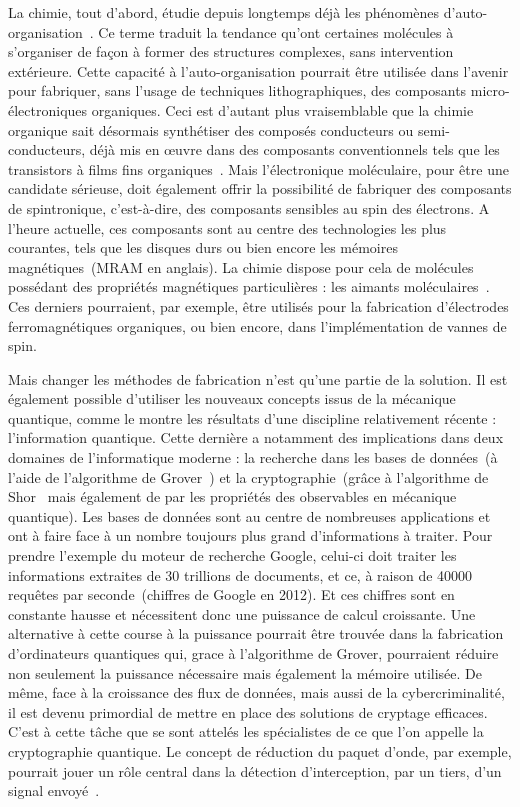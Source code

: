 La chimie, tout d'abord, étudie depuis longtemps déjà les phénomènes d'auto-organisation~\cite{Lehn1988,Lehn1996}. Ce terme traduit la tendance qu'ont certaines molécules à s'organiser de façon à former des structures complexes, sans intervention extérieure. Cette capacité à l'auto-organisation pourrait être utilisée dans l'avenir pour fabriquer, sans l'usage de techniques lithographiques, des composants micro-électroniques organiques. Ceci est d'autant plus vraisemblable que la chimie organique sait désormais synthétiser des composés conducteurs ou semi-conducteurs, déjà mis en œuvre dans des composants conventionnels tels que les transistors à films fins organiques~\cite{Horowitz1990,Lin1997,Klauk2007}. Mais l'électronique moléculaire, pour être une candidate sérieuse, doit également offrir la possibilité de fabriquer des composants de spintronique, c'est-à-dire, des composants sensibles au spin des électrons. A l'heure actuelle, ces composants sont au centre des technologies les plus courantes, tels que les disques durs ou bien encore les mémoires magnétiques~(MRAM en anglais). La chimie dispose pour cela de molécules possédant des propriétés magnétiques particulières : les aimants moléculaires~\cite{Gatteschi2006}. Ces derniers pourraient, par exemple, \^etre utilisés pour la fabrication d'électrodes ferromagnétiques organiques, ou bien encore, dans l'implémentation de vannes de spin.

Mais changer les méthodes de fabrication n'est qu'une partie de la solution. Il est également possible d'utiliser les nouveaux concepts issus de la mécanique quantique, comme le montre les résultats d'une discipline relativement récente : l'information quantique. Cette dernière a notamment des implications dans deux domaines de l'informatique moderne : la recherche dans les bases de données~(à l'aide de l’algorithme de Grover~\cite{Grover2001}) et la cryptographie~(grâce à l'algorithme de Shor~\cite{Vandersypen2001} mais également de par les propriétés des observables en mécanique quantique). Les bases de données sont au centre de nombreuses applications et ont à faire face à un nombre toujours plus grand d'informations à traiter. Pour prendre l'exemple du moteur de recherche Google, celui-ci doit traiter les informations extraites de 30 trillions de documents, et ce, à raison de 40000 requêtes par seconde~(chiffres de Google en 2012). Et ces chiffres sont en constante hausse et nécessitent donc une puissance de calcul croissante. Une alternative à cette course à la puissance pourrait être trouvée dans la fabrication d'ordinateurs quantiques qui, grace à l'algorithme de Grover, pourraient réduire non seulement la puissance nécessaire mais également la mémoire utilisée. De m\^eme, face à la croissance des flux de données, mais aussi de la cybercriminalité, il est devenu primordial de mettre en place des solutions de cryptage efficaces. C'est à cette t\^ache que se sont attelés les spécialistes de ce que l’on appelle la cryptographie quantique. Le concept de réduction du paquet d'onde, par exemple, pourrait jouer un rôle central dans la détection d'interception, par un tiers, d'un signal envoyé~\cite{Bennett1992}.

